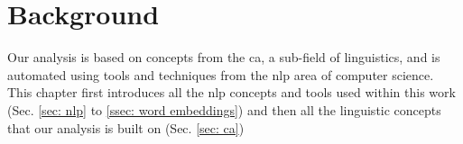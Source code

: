 \chapter{Background \label{cpt: background}}

Our analysis is based on concepts from the \gls{ca}, a sub-field of linguistics, and is automated using tools and techniques from the \gls{nlp} area of computer science. This chapter first introduces all the \gls{nlp} concepts and tools used within this work (Sec. \ref{sec: nlp} to \ref{ssec: word embeddings}) and then all the linguistic concepts that our analysis is built on (Sec. \ref{sec: ca})

 
 
 
 
 



\glsresetall
